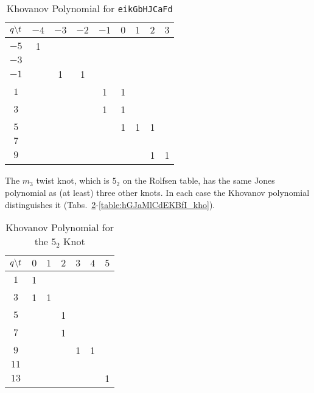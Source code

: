 \documentclass{article}
\theoremstyle{plain}
\begin{document}
        \begin{table}[H]
            \centering
            \begin{tabular}{| c | c | c | c | c | c | c | c | c |}
                \hline
                $q\symbol{92}t$&$-4$&$-3$&$-2$&$-1$&$0$&$1$&$2$&$3$\\
                \hline
                $-5$&1&&&&&&&\\
                \hline
                $-3$&&&&&&&&\\
                \hline
                $-1$&&1&1&&&&&\\
                \hline
                $1$&&&&1&1&&&\\
                \hline
                $3$&&&&1&1&&&\\
                \hline
                $5$&&&&&1&1&1&\\
                \hline
                $7$&&&&&&&&\\
                \hline
                $9$&&&&&&&1&1\\
                \hline
            \end{tabular}
            \caption{Khovanov Polynomial for \texttt{eikGbHJCaFd}}
            \label{table:eikGbHJCaFd_kho}
        \end{table}
        The $m_{3}$ twist knot, which is $5_{2}$ on the Rolfsen table,
        has the same Jones polynomial as (at least) three other knots. In each
        case the Khovanov polynomial distinguishes it
        (Tabs.~\ref{table:m_3_kho}-\ref{table:hGJaMlCdEKBfI_kho}).
        \begin{table}[H]
            \centering
            \begin{tabular}{| c | c | c | c | c | c | c |}
                \hline
                $q\symbol{92}t$&$0$&$1$&$2$&$3$&$4$&$5$\\
                \hline
                $1$&1&&&&&\\
                \hline
                $3$&1&1&&&&\\
                \hline
                $5$&&&1&&&\\
                \hline
                $7$&&&1&&&\\
                \hline
                $9$&&&&1&1&\\
                \hline
                $11$&&&&&&\\
                \hline
                $13$&&&&&&1\\
                \hline
            \end{tabular}
            \caption{Khovanov Polynomial for the $5_{2}$ Knot}
            \label{table:m_3_kho}
        \end{table}
\end{document}
